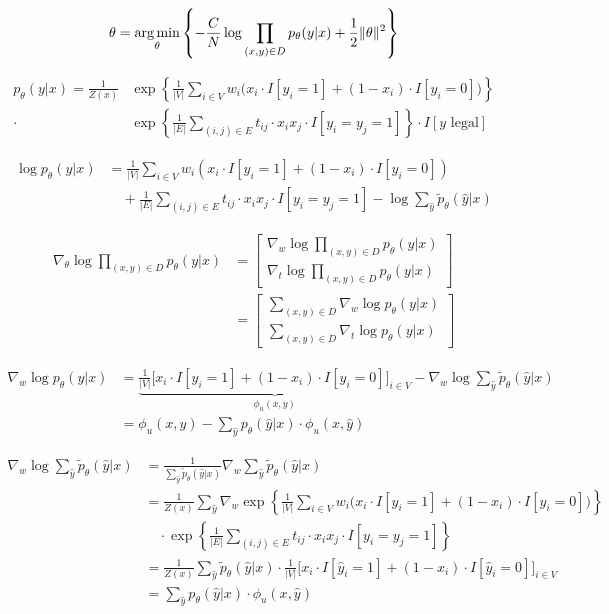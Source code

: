 \documentclass[11pt,a4paper]{article}
\newcommand{\argmin}{\operatornamewithlimits{arg\,min}}
\begin{document}
\[\theta=\argmin_\theta\left\{-\frac{C}{N}\log\prod_{(x,y)\in D}p_\theta(y|x)+\frac{1}{2}\|\theta\|^2\right\}\]

\begin{align*}
p_\theta(y|x)=\frac{1}{Z(x)}&\exp\left\{\frac{1}{|V|}\sum_{i\in V}w_i\big(x_i\cdot I[y_i=1]+(1-x_i)\cdot I[y_i=0]\big)\right\}\\
\cdot&\exp\left\{\frac{1}{|E|}\sum_{(i,j)\in E}t_{ij}\cdot x_ix_j\cdot I[y_i=y_j=1]\right\}\cdot I[y\text{ legal}]
\end{align*}

\begin{align*}
\log p_\theta(y|x)&=\frac{1}{|V|}\sum_{i\in V}w_i(x_i\cdot I[y_i=1]+(1-x_i)\cdot I[y_i=0])\\
&\quad+\frac{1}{|E|}\sum_{(i,j)\in E}t_{ij}\cdot x_ix_j\cdot I[y_i=y_j=1]-\log\sum_{\hat{y}}\tilde{p}_\theta(\hat{y}|x)
\end{align*}

\begin{align*}
\nabla_\theta\log\prod_{(x,y)\in D}p_\theta(y|x)&=\begin{bmatrix}
\nabla_w\log\prod_{(x,y)\in D}p_\theta(y|x)\\ 
\nabla_t\log\prod_{(x,y)\in D}p_\theta(y|x)
\end{bmatrix}\\
&=\begin{bmatrix}
\sum_{(x,y)\in D}\nabla_w\log p_\theta(y|x)\\ 
\sum_{(x,y)\in D}\nabla_t\log p_\theta(y|x)
\end{bmatrix}
\end{align*}

\begin{align*}
\nabla_w\log p_\theta(y|x)&=\underbrace{\frac{1}{|V|}\Big[x_i\cdot I[y_i=1]+(1-x_i)\cdot I[y_i=0]\Big]_{i\in V}}_{\phi_u(x,y)}-\nabla_w\log\sum_{\hat{y}}\tilde{p}_\theta(\hat{y}|x)\\
&=\phi_u(x,y)-\sum_{\hat{y}}p_\theta(\hat{y}|x)\cdot\phi_u(x,\hat{y})
\end{align*}

\begin{align*}
\nabla_w\log\sum_{\hat{y}}\tilde{p}_\theta(\hat{y}|x)&=\frac{1}{\sum_{\hat{y}}\tilde{p}_\theta(\hat{y}|x)}\nabla_w\sum_{\hat{y}}\tilde{p}_\theta(\hat{y}|x)\\
&=\frac{1}{Z(x)}\sum_{\hat{y}}\nabla_w\exp\left\{\frac{1}{|V|}\sum_{i\in V}w_i\big(x_i\cdot I[y_i=1]+(1-x_i)\cdot I[y_i=0]\big)\right\}\\
&\quad\cdot\exp\left\{\frac{1}{|E|}\sum_{(i,j)\in E}t_{ij}\cdot x_ix_j\cdot I[y_i=y_j=1]\right\}\\
&=\frac{1}{Z(x)}\sum_{\hat{y}}\tilde{p}_\theta(\hat{y}|x)\cdot\frac{1}{|V|}\Big[x_i\cdot I[\hat{y}_i=1]+(1-x_i)\cdot I[\hat{y}_i=0]\Big]_{i\in V}\\
&=\sum_{\hat{y}}p_\theta(\hat{y}|x)\cdot\phi_u(x,\hat{y})
\end{align*}
\end{document}
